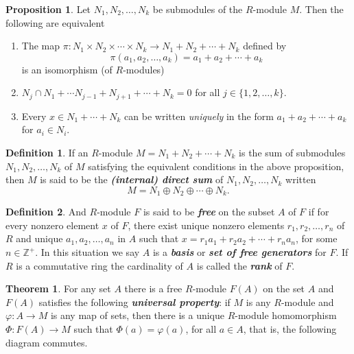 \documentclass[10pt]{article}
\theoremstyle{definition}
\newtheorem{thm}{Theorem}[section]
\newtheorem*{prop}{Proposition}
\newtheorem*{defn}{Definition}
\newcommand{\nl}{\vspace{7em}}
\newcommand{\ra}{\rightarrow}
\newcommand{\Z}{\mathbb{Z}}
\newcommand{\vphi}{\varphi}
\begin{document}
\nl

\begin{prop}
Let $N_1,N_2,\ldots,N_k$ be submodules of the $R$-module $M$. Then the following are equivalent
\begin{enumerate}
\item The map $\pi:N_1\times N_2\times \cdots \times N_k\ra N_1 + N_2 + \cdots + N_k$ defined by 
\[\pi(a_1,a_2,\ldots,a_k) = a_1 + a_2+\cdots + a_k\]
is an isomorphism (of $R$-modules)
\item $N_j\cap N_1+\cdots N_{j-1} + N_{j + 1} +\cdots +N_k = 0$ for all $j\in \{1,2,\ldots, k\}$.
\item Every $x\in N_1+\cdots + N_k$ can be written \textit{uniquely} in the form $a_1 + a_2 + \cdots + a_k$ for $a_i \in N_i$.
\end{enumerate}
\end{prop}

\nl

\begin{defn}
If an $R$-module $M = N_1 + N_2 + \cdots + N_k$ is the sum of submodules $N_1,N_2,\ldots,N_k$ of $M$ satisfying the equivalent conditions in the above proposition, then $M$ is said to be the \textit{\textbf{(internal) direct sum}} of $N_1, N_2, \ldots, N_k$ written
\[M = N_1 \oplus N_2 \oplus \cdots \oplus N_k.\]
\end{defn}

\nl

\begin{defn}
And $R$-module $F$ is said to be \textbf{\textit{free}} on the subset $A$ of $F$ if for every nonzero element $x$ of $F$, there exist unique nonzero elements $r_1,r_2,\ldots, r_n$ of $R$ and unique $a_1,a_2,\ldots, a_n$ in $A$ such that $x = r_1a_1 + r_2 a_2 + \cdots + r_n a_n$, for some $n\in \Z^+$. In this situation we say $A$ is a \textbf{\textit{basis}} or \textbf{\textit{set of free generators}} for $F$. If $R$ is a commutative ring the cardinality of $A$ is called the \textbf{\textit{rank}} of $F$.
\end{defn}

\nl

\begin{thm}
For any set $A$ there is a free $R$-module $F(A)$ on the set $A$ and $F(A)$ satisfies the following \textbf{\textit{universal property}}: if $M$ is any $R$-module and $\vphi: A\ra M$ is any map of sets, then there is a unique $R$-module homomorphism $\Phi:F(A) \ra M$ such that $\Phi(a) = \vphi(a)$, for all $a\in A$, that is, the following diagram commutes.

\begin{center}
\end{center}

\end{thm}
\end{document}
